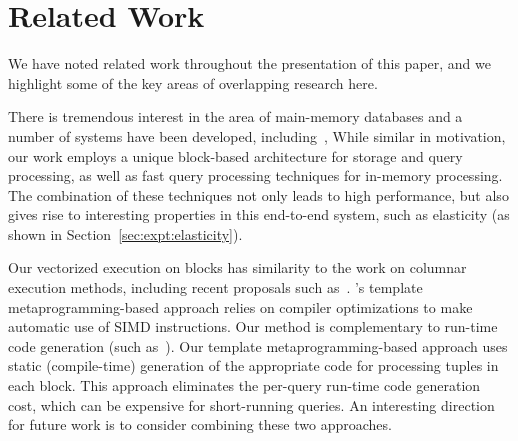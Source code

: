 
\section{Related Work} \label{related}
We have noted related work throughout the presentation of this paper, and we highlight some of the key areas of overlapping research here. 

There is tremendous interest in the area of main-memory databases and a number of systems have been developed, including~\cite{LarsonCFHMNPPRRS13, BonczKM08, RamanABCKKLLLLMMPSSSSZ13, hyper, XinRZFSS13, scuba, SparkSQL, vectorwise, FarberMLGMRD12, oracledbim}, 
While similar in motivation, our work employs a unique block-based architecture for storage and query processing, as well as fast query processing techniques for in-memory processing. The combination of these techniques not only leads to high performance, but also gives rise to interesting properties in this end-to-end system, such as elasticity (as shown in Section~\ref{sec:expt:elasticity}).

Our vectorized execution on blocks has similarity to the work on columnar execution methods, including recent proposals such as~\cite{SIMD-DBMS, RamanSQRDKNS08, JohnsonRSS08,WillhalmPBPZS09, WillhalmO0F13, bitweaving, AbadiMF06,  QiaoRRHL08, FengLKX15}. 
\Quickstep's template metaprogramming-based approach relies on compiler optimizations to make automatic use of SIMD instructions. Our method is complementary to run-time code generation (such as~\cite{JohnsonRSS08,WillhalmPBPZS09, WillhalmO0F13, AbadiMF06,  QiaoRRHL08, FengLKX15, archofadb, Neumann11, SparkSQL, PirkMZM16, NagelBV14, SIMD-DBMS, RamanSQRDKNS08}). Our template metaprogramming-based approach uses static (compile-time) generation of the appropriate code for processing tuples in each block. This approach eliminates the per-query run-time code generation cost, which can be expensive for short-running queries. An interesting direction for future work is to consider combining these two approaches.

